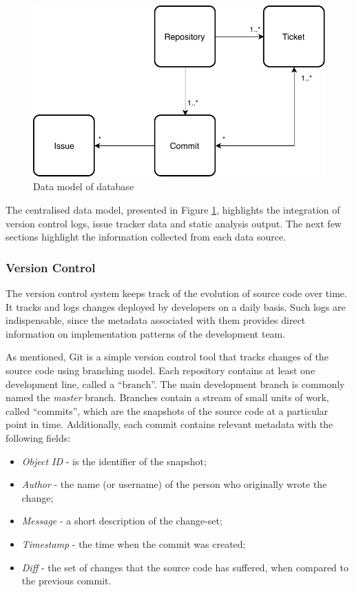 \documentclass{mpaper}
\begin{document}
\begin{figure}
  \centering
  \includegraphics[width=\linewidth]{diagrams/data-model.pdf}
  \caption{Data model of database}
  \label{fig:data-model}
\end{figure}

The centralised data model, presented in Figure \ref{fig:data-model}, highlights
the integration of version control logs, issue tracker data and static analysis
output. The next few sections highlight the information collected from each data
source.

\subsubsection*{Version Control}
\label{version-control}

The version control system keeps track of the evolution of source code over
time. It tracks and logs changes deployed by developers on a daily basis. Such
logs are indispensable, since the metadata associated with them provides direct
information on implementation patterns of the development team.

As mentioned, Git is a simple version control tool that tracks changes of the
source code using branching model. Each repository contains at least one
development line, called a ``branch''. The main development branch is commonly
named the \emph{master} branch. Branches contain a stream of small units of
work, called ``commits'', which are the snapshots of the source code at a
particular point in time. Additionally, each commit contains relevant metadata
with the following fields:

\begin{itemize}
  \item \emph{Object ID} - is the identifier of the snapshot;
  \item \emph{Author} - the name (or username) of the person who originally
  wrote the change;
  \item \emph{Message} - a short description of the change-set;
  \item \emph{Timestamp} - the time when the commit was created;
  \item \emph{Diff} - the set of changes that the source code has suffered, when
  compared to the previous commit. 
\end{itemize}
\end{document}
